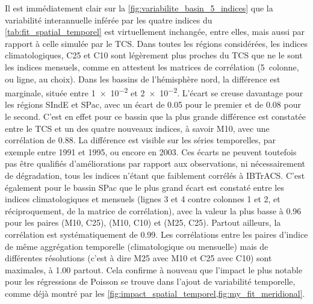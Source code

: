 \documentclass[../main.tex]{subfiles}
\begin{document}
Il est immédiatement clair sur la \cref{fig:variabilite_basin_5_indices} que la variabilité interannuelle inférée par les quatre indices du
\cref{tab:fit_spatial_temporel} est virtuellement inchangée, entre elles, mais aussi par rapport à celle simulée par le TCS. Dans toutes les régions
considérées, les indices climatologiques, C25 et C10 sont légèrement plus proches du TCS que ne le sont les indices mensuels, comme en attestent les matrices de
corrélation (5\ieme~colonne, ou ligne, au choix). Dans les bassins de l'hémisphère nord, la différence est marginale, située entre \num{1e-2} et \num{2e-2}.
L'écart se creuse davantage pour les régions SIndE et SPac, avec un écart de \num{0.05} pour le premier et de \num{0.08} pour le second. C'est en effet pour ce
bassin que la plus grande différence est constatée entre le TCS et un des quatre nouveaux indices, à savoir M10, avec une corrélation de \num{0.88}. La
différence est visible sur les séries temporelles, par exemple entre \num{1991} et \num{1995}, ou encore en \num{2003}. Ces écarts ne peuvent toutefois pas être
qualifiés d'améliorations par rapport aux observations, ni nécessairement de dégradation, tous les indices n'étant que faiblement corrélés à IBTrACS. C'est
également pour le bassin SPac que le plus grand écart est constaté entre les indices climatologiques et mensuels (lignes 3 et 4 contre colonnes 1 et 2, et
réciproquement, de la matrice de corrélation), avec la valeur la plus basse à \num{0.96} pour les paires (M10, C25), (M10, C10) et (M25, C25). Partout ailleurs,
la corrélation est systématiquement de \num{0.99}. Les corrélations entre les paires d'indice de même aggrégation temporelle (climatologique ou mensuelle) mais
de différentes résolutions (c'est à dire M25 avec M10 et C25 avec C10) sont maximales, à \num{1.00} partout. Cela confirme à nouveau que l'impact le plus
notable pour les régressions de Poisson se trouve dans l'ajout de variabilité temporelle, comme déjà montré par les
\cref{fig:impact_spatial_temporel,fig:my_fit_meridional}.
\end{document}
